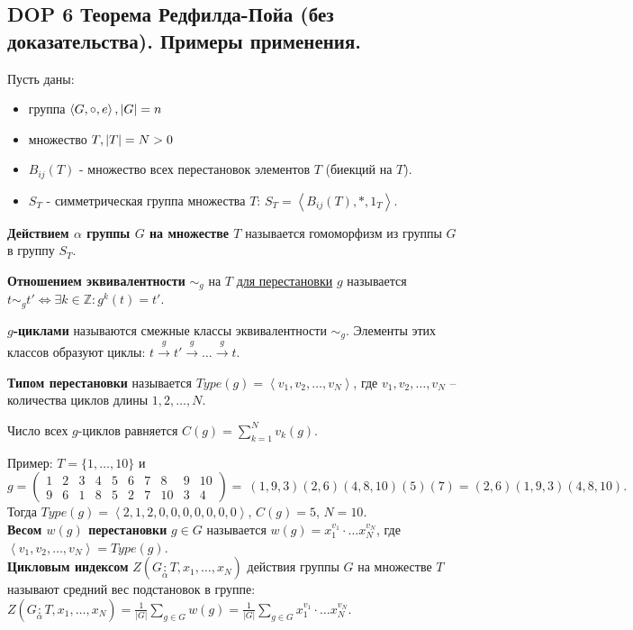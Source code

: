 \subsection{DOP 6 Теорема Редфилда-Пойа (без доказательства). Примеры применения.}

Пусть даны:
\begin{itemize}
    \item группа $\left< G, \circ, e \right>, \space |G| = n$
    \item множество $T, \space |T| = N>0$
    \item $B_{ij}(T)$ - множество всех перестановок элементов $T$ (биекций на $T$).
    \item $S_{T}$ - симметрическая группа множества $T$: $S_{T} = \left< B_{ij}(T), *, 1_{T} \right>$.
\end{itemize}

\textbf{Действием $\alpha$ группы $G$ на множестве $T$} называется гомоморфизм из группы $G$ в группу $S_{T}$.

\textbf{Отношением эквивалентности} $\sim_{g}$ на $T$ \underline{для перестановки} $g$ называется $t \sim_{g} t' \Leftrightarrow \exists k \in \mathbb{Z}: g^k(t) = t'$.

\textbf{$g$-циклами} называются смежные классы эквивалентности $\sim_{g}$. Элементы этих классов образуют циклы:
$t \overset{g}{\to} t' \overset{g}{\to} \ldots \overset{g}{\to} t$.

\textbf{Типом перестановки} называется $Type(g) = \left< v_{1}, v_{2}, \dots, v_{N} \right>$,
где $v_{1}, v_{2}, \dots, v_{N}$ -- количества циклов длины $1, 2, \dots, N$.

Число всех $g$-циклов равняется $C(g) = \sum\limits_{k=1}^{N} v_{k}(g)$.

Пример: $T = \{1, \dots, 10\}$ и
$$g = \begin{pmatrix} 1&2&3&4&5&6&7&8&9&10 \\ 9&6&1&8&5&2&7&10&3&4 \end{pmatrix} = \
(1,9,3)(2,6)(4,8,10)(5)(7) = (2,6)(1,9,3)(4,8,10).$$
Тогда $Type(g) = \left< 2, 1, 2, 0, 0, 0, 0, 0, 0, 0 \right>$, $C(g) = 5$, $N = 10$.\\

\textbf{Весом $w(g)$ перестановки} $g \in G$ называется $w(g) = x_{1}^{v_{1}} \cdot \dots x_{N}^{v_{N}}$, где $\left< v_{1}, v_{2}, \dots, v_{N} \right> = Type(g)$.\\

\textbf{Цикловым индексом} $Z(G \underset{\alpha}{:}T, x_{1}, \dots, x_{N})$ действия группы $G$ на множестве $T$ называют средний вес подстановок в группе: $Z(G \underset{\alpha}{:}T, x_{1}, \dots, x_{N}) = \frac{1}{|G|} \sum\limits_{g \in G} w(g) = \frac{1}{|G|} \sum\limits_{g \in G} x_{1}^{v_{1}} \cdot \dots x_{N}^{v_{N}}$.\\



